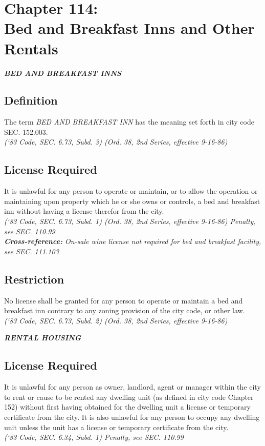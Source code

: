 \chapter*{Chapter 114: \\
	Bed and Breakfast Inns and Other Rentals}
    \minitoc
    \pagebreak

\begin{center}
    \emph{\textbf{\LARGE{BED AND BREAKFAST INNS}}}
\end{center}

\section{Definition}
The term \emph{BED AND BREAKFAST INN} has the meaning set forth in city code SEC. 152.003.\\
\emph{(‘83 Code, SEC. 6.73, Subd. 3)  (Ord. 38, 2nd Series, effective 9-16-86)}
\section{License Required}
It is unlawful for any person to operate or maintain, or to allow the operation or maintaining upon property which he or she owns or controls, a bed and breakfast inn without having a license therefor from the city.\\
\emph{(‘83 Code, SEC. 6.73, Subd. 1)  (Ord. 38, 2nd Series, effective 9-16-86)  Penalty, see SEC. 110.99}\\
\emph{\textbf{Cross-reference:} On-sale wine license not required for bed and breakfast facility, see SEC. 111.103}
\section{Restriction}
No license shall be granted for any person to operate or maintain a bed and breakfast inn contrary to any zoning provision of the city code, or other law.\\
\emph{(‘83 Code, SEC. 6.73, Subd. 2)  (Ord. 38, 2nd Series, effective 9-16-86)}

\begin{center}
    \emph{\textbf{\LARGE{RENTAL HOUSING}}}
\end{center}

\setcounter{section}{14}
\section{License Required}
It is unlawful for any person as owner, landlord, agent or manager within the city to rent or cause to be rented any dwelling unit (as defined in city code Chapter 152) without first having obtained for the dwelling unit a license or temporary certificate from the city. It is also unlawful for any person to occupy any dwelling unit unless the unit has a license or temporary certificate from the city.\\
\emph{(‘83 Code, SEC. 6.34, Subd. 1)  Penalty, see SEC. 110.99}
